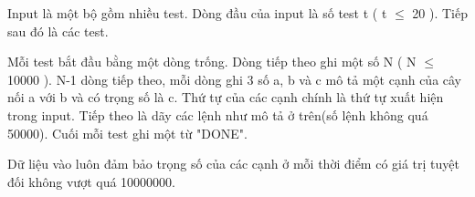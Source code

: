 Input là một bộ gồm nhiều test. Dòng đầu của input là số test t ( t $\le$ 20 ). Tiếp sau đó là các test.   


   Mỗi test bắt đầu bằng một dòng trống. Dòng tiếp theo ghi một số N ( N $\le$ 10000 ). N-1 dòng tiếp theo, mỗi dòng ghi 3 số a, b và c mô tả một cạnh của cây nối a với b và có trọng số là c. Thứ tự của các cạnh chính là thứ tự xuất hiện trong input. Tiếp theo là dãy các lệnh như mô tả ở trên(số lệnh không quá 50000). Cuối mỗi test ghi một từ "DONE".   


   Dữ liệu vào luôn đảm bảo trọng số của các cạnh ở mỗi thời điểm có giá trị tuyệt đối không vượt quá 10000000.